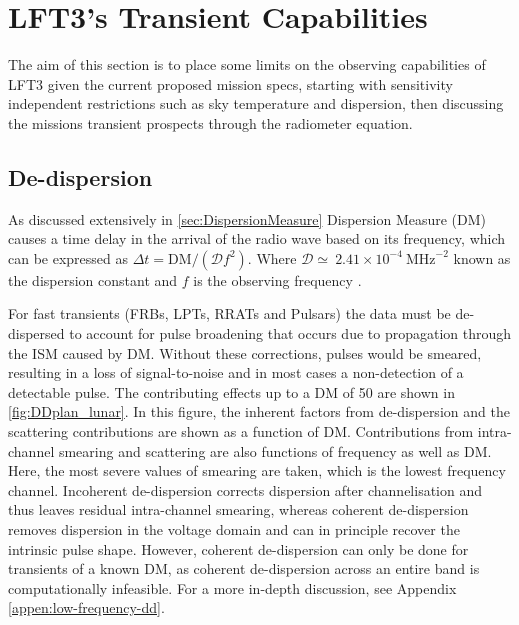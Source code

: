 
\section{LFT3's Transient Capabilities} \label{sec:transientSpecs}

The aim of this section is to place some limits on the observing capabilities of LFT3 given the current proposed mission specs, starting with sensitivity independent restrictions such as sky temperature and dispersion, then discussing the missions transient prospects through the radiometer equation. 


\subsection{De-dispersion}

As discussed extensively in \cref{sec:DispersionMeasure} Dispersion Measure (DM) causes a time delay in the arrival of the radio wave based on its frequency, which can be expressed as $\Delta t = \text{DM}/(\mathcal{D}f^2)$. Where $\mathcal{D \simeq}~2.41\times10^{-4}~\text{MHz}^{-2}$ known as the dispersion constant and $f$ is the observing frequency \cite{kulkarni_dispersion_2020}. 

For fast transients (FRBs, LPTs, RRATs and Pulsars) the data must be de-dispersed to account for pulse broadening that occurs due to propagation through the ISM caused by DM. Without these corrections, pulses would be smeared, resulting in a loss of signal-to-noise and in most cases a non-detection of a detectable pulse. The contributing effects up to a DM of 50 \dm are shown in \cref{fig:DDplan_lunar}. In this figure, the inherent factors from de-dispersion and the scattering contributions are shown as a function of DM. Contributions from intra-channel smearing and scattering are also functions of frequency as well as DM. Here, the most severe values of smearing are taken, which is the lowest frequency channel. Incoherent de-dispersion corrects dispersion after channelisation and thus leaves residual intra-channel smearing, whereas coherent de-dispersion removes dispersion in the voltage domain and can in principle recover the intrinsic pulse shape. However, coherent de-dispersion can only be done for transients of a known DM, as coherent de-dispersion across an entire band is computationally infeasible. For a more in-depth discussion, see Appendix \ref{appen:low-frequency-dd}. 




